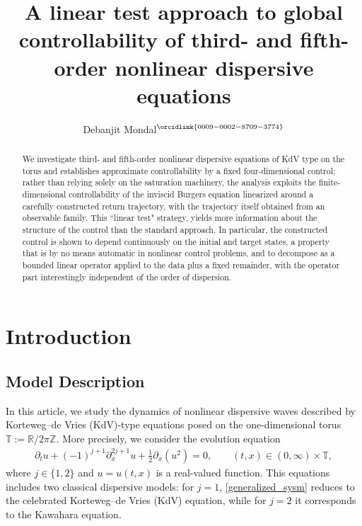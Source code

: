 \documentclass[10pt, reqno]{amsart}
\title[Finite-dimensional controllability of KdV-type equation by linear test]{A linear test approach to global controllability of third- and fifth-order nonlinear dispersive equations}
\author[D. Mondal]{Debanjit Mondal$^{\orcidlink{0009-0002-8709-3774}}$}
\numberwithin{equation}{section}
\begin{document}
\begin{abstract}
	We investigate third- and fifth-order nonlinear dispersive equations of KdV type on the torus and establishes approximate controllability by a fixed four-dimensional control; rather than relying solely on the saturation machinery, the analysis exploits the finite-dimensional controllability of the inviscid Burgers equation linearized around a carefully constructed return trajectory, with the trajectory itself obtained from an observable family. This ``linear test" strategy, yields more information about the structure of the control than the standard approach. In particular, the constructed control is shown to depend continuously on the initial and target states, a property that is by no means automatic in nonlinear control problems, and to decompose as a bounded linear operator applied to the data plus a fixed remainder, with the operator part interestingly  independent of the order of dispersion. 
\end{abstract}

\allowdisplaybreaks
\maketitle
\section{Introduction}
\subsection{Model Description}

In this article, we study the dynamics of nonlinear dispersive waves described by Korteweg--de Vries (KdV)-type equations posed on the one-dimensional torus $\mathbb{T} := \mathbb{R}/2\pi\mathbb{Z}$. More precisely, we consider the evolution equation
\begin{align}\label{generalized_sysm}
	\partial_t u + (-1)^{j+1}\partial_x^{2j+1} u + \frac{1}{2}\partial_x(u^2) = 0,
	\qquad (t,x)\in(0,\infty)\times\mathbb{T},
\end{align}
where $j\in\{1,2\}$ and $u=u(t,x)$ is a real-valued function. This equations includes two classical dispersive models: for $j=1$, \eqref{generalized_sysm} reduces to the celebrated Korteweg--de Vries (KdV) equation, while for $j=2$ it corresponds to the Kawahara equation.
\end{document}
